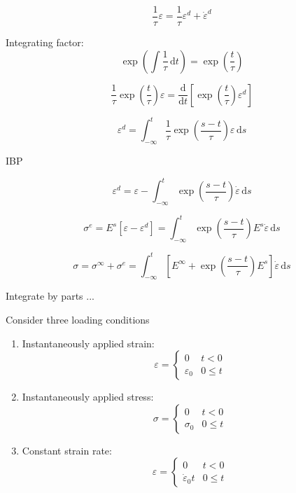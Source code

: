 \documentclass[12pt]{article}
\renewcommand{\d}{\text{d}}
\newcommand{\der}[2]{\dfrac{\text{d} #1}{\text{d} #2}}
\begin{document}
\begin{equation}
	\dfrac{1}{\tau}\varepsilon =  \dfrac{1}{\tau}\varepsilon^{d} + \dot{\varepsilon}^{d}
\end{equation}

Integrating factor:
\begin{equation}
	\exp\left(\int\dfrac{1}{\tau}\,\d t\right) = 	\exp\left(\dfrac{t}{\tau}\right) 
\end{equation}

\begin{equation}
	\dfrac{1}{\tau}\exp\left(\dfrac{t}{\tau}\right) \varepsilon =  \der{ }{t}\left[\exp\left(\dfrac{t}{\tau}\right) \varepsilon^{d} \right] 
\end{equation}

\begin{equation}
	\varepsilon^{d} = \int_{-\infty}^{t}\dfrac{1}{\tau}\exp\left(\dfrac{s-t}{\tau}\right)\varepsilon \,\d s
\end{equation}

IBP

\begin{equation}
		\varepsilon^{d} = \varepsilon - \int_{-\infty}^{t} \exp\left(\dfrac{s-t}{\tau}\right)\dot{\varepsilon} \,\d s
\end{equation}

\begin{equation}
	\sigma^{e} = E^{s}\left[\varepsilon-\varepsilon^{d}\right] =  \int_{-\infty}^{t} \exp\left(\dfrac{s-t}{\tau}\right)E^{s}\dot{\varepsilon} \,\d s
\end{equation}

\begin{equation}
	\sigma = \sigma^{\infty} + \sigma^{e} = \int_{-\infty}^{t} \left[E^{\infty} + \exp\left(\dfrac{s-t}{\tau}\right)E^{s}\right]\dot{\varepsilon} \,\d s
\end{equation}

Integrate by parts ...

Consider three loading conditions
\begin{enumerate}
	\item Instantaneously applied strain:
	\begin{equation}
		\varepsilon = \begin{cases}
			0& t<0\\
			\varepsilon_{0} & 0 \leq t
		\end{cases}
	\end{equation}
	\item Instantaneously applied stress:
	\begin{equation}
		\sigma = \begin{cases}
			0& t<0\\
			\sigma_{0} & 0 \leq t
		\end{cases}
	\end{equation}
	\item Constant strain rate:\begin{equation}
		\varepsilon = \begin{cases}
			0& t<0\\
			\dot{\varepsilon}_{0}t & 0 \leq t
		\end{cases}
	\end{equation}	
\end{enumerate}
\end{document}
